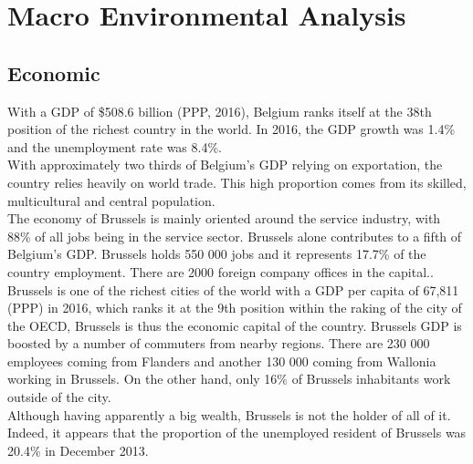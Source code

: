 \documentclass[12pt,a4paper,oneside]{book}
\begin{document}
\section{Macro Environmental Analysis}

\subsection{Economic}

With a GDP of \$508.6 billion (PPP, 2016), Belgium ranks itself at the 38th position of the richest country in the world. In 2016, the GDP growth was 1.4\% and the unemployment rate was 8.4\%.\\
With approximately two thirds of Belgium's GDP relying on exportation, the country relies heavily on world trade. This high proportion comes from its skilled, multicultural and central population\cite{ciafb}.\\

The economy of Brussels is mainly oriented around the service industry, with 88\% of all jobs being in the service sector. Brussels alone contributes to a fifth of Belgium's GDP. Brussels holds 550 000 jobs and it represents 17.7\% of the country employment. There are 2000 foreign company offices in the capital.\cite{bxinfo}.\\
Brussels is one of the richest cities of the world with a GDP per capita of 67,811 (PPP) in 2016, which ranks it at the 9th position within the raking of the city of the OECD\cite{oecdstat}, Brussels is thus the economic capital of the country. Brussels GDP is boosted by a number of commuters from nearby regions. There are 230 000 employees coming from Flanders and another 130 000 coming from Wallonia working in Brussels. On the other hand, only 16\% of Brussels inhabitants work outside of the city\cite{euresCom}.\\
Although having apparently a big wealth, Brussels is not the holder of all of it. Indeed, it appears that the proportion of the unemployed resident of Brussels was 20.4\% in December 2013.\cite{unemploybx}\citeauthor{unemploybx}
\end{document}
